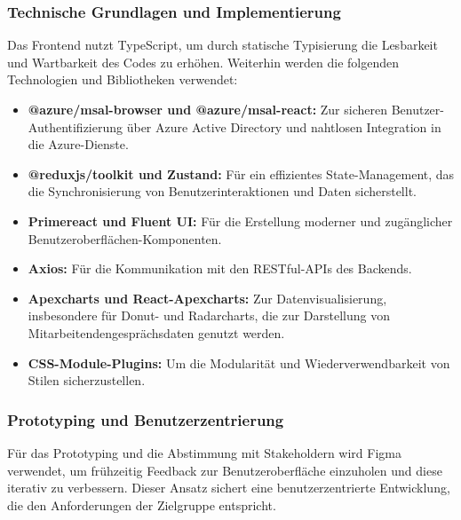 \subsubsection*{Technische Grundlagen und Implementierung} 
Das Frontend nutzt TypeScript, um durch statische Typisierung die Lesbarkeit und Wartbarkeit des Codes zu erhöhen. Weiterhin werden die folgenden Technologien und Bibliotheken verwendet: 
\begin{itemize}
    \item \textbf{@azure/msal-browser und @azure/msal-react:} Zur sicheren Benutzer-Authentifizierung über Azure Active Directory und nahtlosen Integration in die Azure-Dienste.
    \item \textbf{@reduxjs/toolkit und Zustand:} Für ein effizientes State-Management, das die Synchronisierung von Benutzerinteraktionen und Daten sicherstellt.
    \item \textbf{Primereact und Fluent UI:} Für die Erstellung moderner und zugänglicher Benutzeroberflächen-Komponenten.
    \item \textbf{Axios:} Für die Kommunikation mit den RESTful-APIs des Backends.
    \item \textbf{Apexcharts und React-Apexcharts:} Zur Datenvisualisierung, insbesondere für Donut- und Radarcharts, die zur Darstellung von Mitarbeitendengesprächsdaten genutzt werden.
    \item \textbf{CSS-Module-Plugins:} Um die Modularität und Wiederverwendbarkeit von Stilen sicherzustellen.
\end{itemize}

\subsubsection*{Prototyping und Benutzerzentrierung} 
Für das Prototyping und die Abstimmung mit Stakeholdern wird Figma verwendet, um frühzeitig Feedback zur Benutzeroberfläche einzuholen und diese iterativ zu verbessern. Dieser Ansatz sichert eine benutzerzentrierte Entwicklung, die den Anforderungen der Zielgruppe entspricht.

